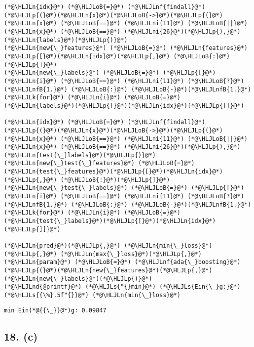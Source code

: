 \documentclass[12pt,a4paper]{article}
\newcommand{\HLJLk}[1]{\textcolor[RGB]{148,91,176}{\textbf{#1}}}
\newcommand{\HLJLn}[1]{#1}
\newcommand{\HLJLnd}[1]{\textcolor[RGB]{214,102,97}{#1}}
\newcommand{\HLJLnf}[1]{\textcolor[RGB]{66,102,213}{#1}}
\newcommand{\HLJLs}[1]{\textcolor[RGB]{201,61,57}{#1}}
\newcommand{\HLJLnfB}[1]{\textcolor[RGB]{59,151,46}{#1}}
\newcommand{\HLJLni}[1]{\textcolor[RGB]{59,151,46}{#1}}
\newcommand{\HLJLoB}[1]{\textcolor[RGB]{102,102,102}{\textbf{#1}}}
\newcommand{\HLJLp}[1]{#1}
\begin{document}
\begin{lstlisting}
(*@\HLJLn{idx}@*) (*@\HLJLoB{=}@*) (*@\HLJLnf{findall}@*)(*@\HLJLp{(}@*)(*@\HLJLn{x}@*)(*@\HLJLoB{->}@*)(*@\HLJLp{(}@*)(*@\HLJLn{x}@*) (*@\HLJLoB{==}@*) (*@\HLJLni{11}@*) (*@\HLJLoB{||}@*) (*@\HLJLn{x}@*) (*@\HLJLoB{==}@*) (*@\HLJLni{26}@*)(*@\HLJLp{),}@*) (*@\HLJLn{labels}@*)(*@\HLJLp{)}@*)
(*@\HLJLn{new{\_}features}@*) (*@\HLJLoB{=}@*) (*@\HLJLn{features}@*)(*@\HLJLp{[}@*)(*@\HLJLn{idx}@*)(*@\HLJLp{,}@*) (*@\HLJLoB{:}@*)(*@\HLJLp{]}@*)
(*@\HLJLn{new{\_}labels}@*) (*@\HLJLoB{=}@*) (*@\HLJLp{[}@*)(*@\HLJLn{i}@*) (*@\HLJLoB{==}@*) (*@\HLJLni{11}@*) (*@\HLJLoB{?}@*) (*@\HLJLnfB{1.}@*) (*@\HLJLoB{:}@*) (*@\HLJLoB{-}@*)(*@\HLJLnfB{1.}@*) (*@\HLJLk{for}@*) (*@\HLJLn{i}@*) (*@\HLJLoB{=}@*) (*@\HLJLn{labels}@*)(*@\HLJLp{[}@*)(*@\HLJLn{idx}@*)(*@\HLJLp{]]}@*)

(*@\HLJLn{idx}@*) (*@\HLJLoB{=}@*) (*@\HLJLnf{findall}@*)(*@\HLJLp{(}@*)(*@\HLJLn{x}@*)(*@\HLJLoB{->}@*)(*@\HLJLp{(}@*)(*@\HLJLn{x}@*) (*@\HLJLoB{==}@*) (*@\HLJLni{11}@*) (*@\HLJLoB{||}@*) (*@\HLJLn{x}@*) (*@\HLJLoB{==}@*) (*@\HLJLni{26}@*)(*@\HLJLp{),}@*) (*@\HLJLn{test{\_}labels}@*)(*@\HLJLp{)}@*)
(*@\HLJLn{new{\_}test{\_}features}@*) (*@\HLJLoB{=}@*) (*@\HLJLn{test{\_}features}@*)(*@\HLJLp{[}@*)(*@\HLJLn{idx}@*)(*@\HLJLp{,}@*) (*@\HLJLoB{:}@*)(*@\HLJLp{]}@*)
(*@\HLJLn{new{\_}test{\_}labels}@*) (*@\HLJLoB{=}@*) (*@\HLJLp{[}@*)(*@\HLJLn{i}@*) (*@\HLJLoB{==}@*) (*@\HLJLni{11}@*) (*@\HLJLoB{?}@*) (*@\HLJLnfB{1.}@*) (*@\HLJLoB{:}@*) (*@\HLJLoB{-}@*)(*@\HLJLnfB{1.}@*) (*@\HLJLk{for}@*) (*@\HLJLn{i}@*) (*@\HLJLoB{=}@*) (*@\HLJLn{test{\_}labels}@*)(*@\HLJLp{[}@*)(*@\HLJLn{idx}@*)(*@\HLJLp{]]}@*)

(*@\HLJLn{pred}@*)(*@\HLJLp{,}@*) (*@\HLJLn{min{\_}loss}@*)(*@\HLJLp{,}@*) (*@\HLJLn{max{\_}loss}@*)(*@\HLJLp{,}@*) (*@\HLJLn{param}@*) (*@\HLJLoB{=}@*) (*@\HLJLnf{ada{\_}boosting}@*)(*@\HLJLp{(}@*)(*@\HLJLn{new{\_}features}@*)(*@\HLJLp{,}@*) (*@\HLJLn{new{\_}labels}@*)(*@\HLJLp{)}@*)
(*@\HLJLnd{@printf}@*) (*@\HLJLs{"{}min}@*) (*@\HLJLs{Ein{\_}g:}@*) (*@\HLJLs{{\%}.5f"{}}@*) (*@\HLJLn{min{\_}loss}@*)
\end{lstlisting}

\begin{lstlisting}
min Ein(*@{{\_}}@*)g: 0.09847
\end{lstlisting}


\subsection{18. (c)}
\end{document}
